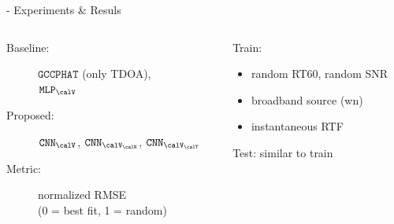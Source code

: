 \begin{frame}[t]{\lantern - Experiments \& Resuls}

    \vspace*{-0.5em}
    \begin{columns}[T]
            \begin{column}{0.60\textwidth}

                \begin{description}
                    \item[Baseline:] $\mathtt{GCCPHAT}$ (only TDOA),
                                    \\$\mathtt{MLP}_{\calV}$~\cite{di2019mirage}
                    \item[Proposed:] $\mathtt{CNN}_{\calV}$, $\mathtt{CNN}_{\calV_{\calN}}$, $\mathtt{CNN}_{\calV_{\calT}}$

                    \pause
                    \item[Metric:] normalized RMSE
                                    \\(0 = best fit, 1 = random)
                \end{description}

            \end{column}

            \pause
            \begin{column}{0.35\textwidth}
            \small
            Train:
            \begin{itemize}
                \item random RT60, random SNR
                \item broadband source (wn)
                \item instantaneous RTF
            \end{itemize}
            Test: similar to train

        \end{column}

    \end{columns}

    \pause[3]

\end{frame}
